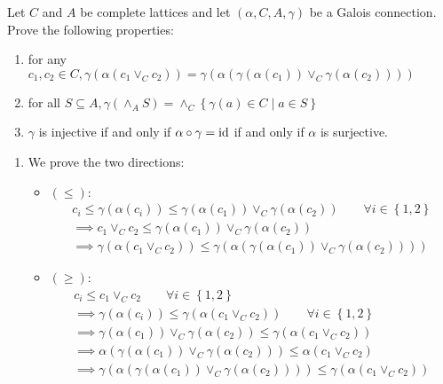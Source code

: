 \begin{exercise}{
    Let $C$ and $A$ be complete lattices and let $(\alpha, C, A, \gamma)$ be a Galois connection. Prove the following properties:
    \begin{enumerate}[(1)]
        \item for any $c_1, c_2 \in C, \gamma(\alpha(c_1 \vee_C c_2)) = \gamma(\alpha(\gamma(\alpha(c_1)) \vee_C \gamma(\alpha(c_2))))$
        \item for all $S \subseteq A, \gamma(\wedge_A S) = \wedge_C \left\{\gamma(a) \in C \mid a \in S \right\}$
        \item $\gamma$ is injective if and only if $\alpha \circ \gamma = \operatorname{id}$ if and only if $\alpha$ is surjective.
    \end{enumerate}
}
    \begin{enumerate}[(1)]
        \item We prove the two directions:
        \begin{itemize}
            \item $(\leq)$:
            \begin{gather*}
                c_i \leq \gamma(\alpha(c_i)) \leq \gamma(\alpha(c_1)) \vee_C \gamma(\alpha(c_2)) \quad\quad \forall i \in \left\{ 1, 2 \right\} \\
                \implies c_1 \vee_C c_2 \leq \gamma(\alpha(c_1)) \vee_C \gamma(\alpha(c_2)) \\
                \implies \gamma(\alpha(c_1 \vee_C c_2)) \leq \gamma(\alpha(\gamma(\alpha(c_1)) \vee_C \gamma(\alpha(c_2))))
            \end{gather*}
            \item $(\geq)$:
            \begin{gather*}
                c_i \leq c_1 \vee_C c_2 \quad\quad \forall i \in \left\{ 1, 2 \right\} \\
                \implies \gamma(\alpha(c_i)) \leq \gamma(\alpha(c_1 \vee_C c_2)) \quad\quad \forall i \in \left\{ 1, 2 \right\} \\
                \implies \gamma(\alpha(c_1)) \vee_C \gamma(\alpha(c_2)) \leq \gamma(\alpha(c_1 \vee_C c_2)) \\
                \implies \alpha(\gamma(\alpha(c_1)) \vee_C \gamma(\alpha(c_2))) \leq \alpha(c_1 \vee_C c_2) \\
                \implies \gamma(\alpha(\gamma(\alpha(c_1)) \vee_C \gamma(\alpha(c_2)))) \leq \gamma(\alpha(c_1 \vee_C c_2))
            \end{gather*}
        \end{itemize}

\end{enumerate}
\end{exercise}
